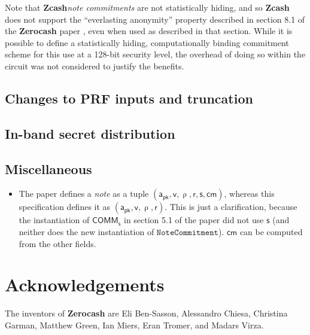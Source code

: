 \documentclass{article}
\newcommand{\todo}[1]{{\color{Sepia}\sf{TODO: #1}}}
\newcommand{\term}[1]{\textsl{#1}\xspace}
\newcommand{\termbf}[1]{\textbf{#1}\xspace}
\newcommand{\Zcash}{\termbf{Zcash}}
\newcommand{\Zerocash}{\termbf{Zerocash}}
\newcommand{\coin}{\term{note}}
\newcommand{\coinCommitments}{\term{note commitments}}
\newcommand{\CRH}{\mathsf{CRH}}
\newcommand{\AuthPublic}{\mathsf{a_{pk}}}
\newcommand{\Value}{\mathsf{v}}
\newcommand{\CoinCommitRand}{\mathsf{r}}
\newcommand{\CoinAddressRand}{\mathsf{\uprho}}
\newcommand{\CoinCommitS}{\mathsf{s}}
\newcommand{\cm}{\mathsf{cm}}
\newcommand{\COMM}[1]{\mathsf{COMM}_{#1}}
\newcommand{\Commitment}{\mathtt{NoteCommitment}}
\begin{document}
Note that \Zcash \coinCommitments are not statistically hiding, and
so \Zcash does not support the ``everlasting anonymity'' property
described in section 8.1 of the \Zerocash paper \cite{ZerocashOakland},
even when used as described in that section. While it is possible to
define a statistically hiding, computationally binding commitment scheme
for this use at a 128-bit security level, the overhead of doing so
within the circuit was not considered to justify the benefits.

\subsection{Changes to PRF inputs and truncation}

\todo{}


\subsection{In-band secret distribution}

\todo{}

\subsection{Miscellaneous}

\begin{itemize}
    \item The paper defines a \coin as a tuple $(\AuthPublic, \Value,
\CoinAddressRand, \CoinCommitRand, \CoinCommitS, \cm)$, whereas this specification
defines it as $(\AuthPublic, \Value, \CoinAddressRand, \CoinCommitRand)$.
This is just a clarification, because the instantiation of $\COMM{\CoinCommitS}$
in section 5.1 of the paper did not use $\CoinCommitS$ (and neither does the
new instantiation of $\Commitment$). $\cm$ can be computed from the other
fields.
\end{itemize}


\section{Acknowledgements}

The inventors of \Zerocash are Eli Ben-Sasson, Alessandro Chiesa,
Christina Garman, Matthew Green, Ian Miers, Eran Tromer, and Madars
Virza.
\end{document}
